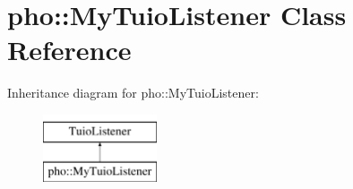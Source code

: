 \hypertarget{classpho_1_1MyTuioListener}{\section{pho\-:\-:My\-Tuio\-Listener Class Reference}
\label{classpho_1_1MyTuioListener}
}
Inheritance diagram for pho\-:\-:My\-Tuio\-Listener\-:\begin{figure}[H]
\begin{center}
\leavevmode
\includegraphics[height=2.000000cm]{classpho_1_1MyTuioListener}
\end{center}
\end{figure}
